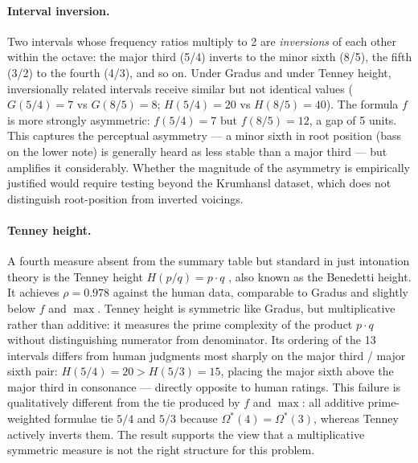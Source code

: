 \documentclass[11pt,a4paper]{article}
\newcommand{\Os}{\Omega^{*}}
\begin{document}
\paragraph{Interval inversion.}
Two intervals whose frequency ratios multiply to 2 are \emph{inversions} of
each other within the octave: the major third (5/4) inverts to the minor
sixth (8/5), the fifth (3/2) to the fourth (4/3), and so on. Under Gradus
and under Tenney height, inversionally related intervals receive similar but
not identical values ($G(5/4) = 7$ vs $G(8/5) = 8$; $H(5/4) = 20$ vs
$H(8/5) = 40$). The formula $f$ is more strongly asymmetric: $f(5/4) = 7$
but $f(8/5) = 12$, a gap of 5 units. This captures the perceptual asymmetry
--- a minor sixth in root position (bass on the lower note) is generally
heard as less stable than a major third --- but amplifies it considerably.
Whether the magnitude of the asymmetry is empirically justified would require
testing beyond the Krumhansl dataset, which does not distinguish root-position
from inverted voicings.

\paragraph{Tenney height.}
A fourth measure absent from the summary table but standard in just intonation
theory is the Tenney height $H(p/q) = p \cdot q$ \cite{tenney1988}, also
known as the Benedetti height. It achieves $\rho = 0.978$ against the human
data, comparable to Gradus and slightly below $f$ and $\max$. Tenney height
is symmetric like Gradus, but multiplicative rather than additive: it measures
the prime complexity of the product $p \cdot q$ without distinguishing
numerator from denominator. Its ordering of the 13 intervals differs from
human judgments most sharply on the major third / major sixth pair: $H(5/4) =
20 > H(5/3) = 15$, placing the major sixth above the major third in
consonance --- directly opposite to human ratings. This failure is qualitatively
different from the tie produced by $f$ and $\max$: all additive prime-weighted
formulae tie $5/4$ and $5/3$ because $\Os(4) = \Os(3)$, whereas Tenney
actively inverts them. The result supports the view that a multiplicative
symmetric measure is not the right structure for this problem.
\end{document}
